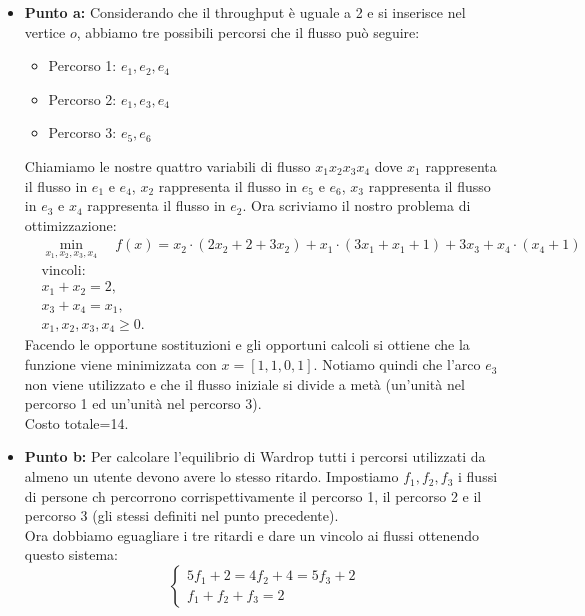 \documentclass[a4paper,12pt]{article}
\begin{document}
		\begin{itemize}
			\item \textbf{Punto a: }Considerando che il throughput è uguale a 2 e si inserisce nel vertice $o$, abbiamo tre possibili percorsi che il flusso può seguire:
			\begin{itemize}
				\item Percorso 1: $e_1, e_2, e_4$
				\item Percorso 2: $e_1, e_3, e_4$
				\item Percorso 3: $e_5, e_6$
			\end{itemize}
			Chiamiamo le nostre quattro variabili di flusso $x_1x_2x_3x_4$ dove $x_1$ rappresenta il flusso in $e_1$ e $e_4$, $x_2$ rappresenta il flusso in $e_5$ e $e_6$, $x_3$ rappresenta il flusso in $e_3$ e $x_4$ rappresenta il flusso in $e_2$. Ora scriviamo il nostro problema di ottimizzazione:\\
			\[
			\begin{aligned}
				&\min_{x_1, x_2, x_3, x_4} \quad f(x) = x_2 \cdot (2 x_2 + 2 + 3 x_2) + x_1 \cdot (3 x_1 + x_1 + 1) + 3 x_3 + x_4 \cdot (x_4 + 1) \\
				&\text{vincoli:} \\
				&x_1 + x_2 = 2, \\
				&x_3 + x_4 = x_1, \\
				&x_1,x_2,x_3,x_4 \geq 0.
			\end{aligned}
			\]
			Facendo le opportune sostituzioni e gli opportuni calcoli si ottiene che la funzione viene minimizzata con $x=[1,1,0,1]$. Notiamo quindi che l'arco $e_3$ non viene utilizzato e che il flusso iniziale si divide a metà (un'unità nel percorso 1 ed un'unità nel percorso 3).\\
			Costo totale=14.
			\item \textbf{Punto b: }Per calcolare l'equilibrio di Wardrop tutti i percorsi utilizzati da almeno un utente devono avere lo stesso ritardo. Impostiamo $f_1, f_2, f_3$ i flussi di persone ch percorrono corrispettivamente il percorso 1, il percorso 2 e il percorso 3 (gli stessi definiti nel punto precedente).\\
			Ora dobbiamo eguagliare i tre ritardi e dare un vincolo ai flussi ottenendo questo sistema:\\
			\begin{equation}
				\begin{cases}
					5f_1+2=4f_2+4=5f_3+2 \\
					f_1+f_2+f_3=2
				\end{cases}
			\end{equation}

\end{itemize}
\end{document}
